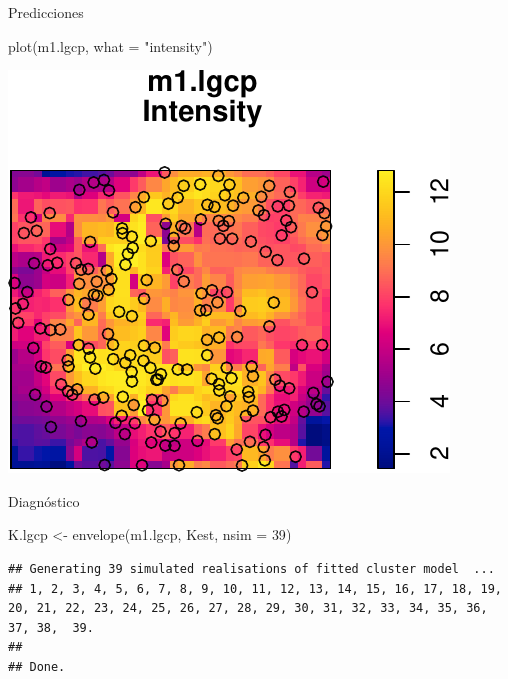 \documentclass[
  11pt,
  ignorenonframetext,
]{beamer}
\newenvironment{Shaded}{}{}
\newcommand{\AttributeTok}[1]{\textcolor[rgb]{0.49,0.56,0.16}{#1}}
\newcommand{\DecValTok}[1]{\textcolor[rgb]{0.25,0.63,0.44}{#1}}
\newcommand{\FunctionTok}[1]{\textcolor[rgb]{0.02,0.16,0.49}{#1}}
\newcommand{\NormalTok}[1]{#1}
\newcommand{\OtherTok}[1]{\textcolor[rgb]{0.00,0.44,0.13}{#1}}
\newcommand{\StringTok}[1]{\textcolor[rgb]{0.25,0.44,0.63}{#1}}
\begin{document}
\begin{frame}[fragile]{Predicciones}
\protect\hypertarget{predicciones}{}
\begin{Shaded}
\begin{Highlighting}[]
\FunctionTok{plot}\NormalTok{(m1.lgcp, }\AttributeTok{what =} \StringTok{"intensity"}\NormalTok{)}
\end{Highlighting}
\end{Shaded}

\begin{center}\includegraphics{Tutorial-spatstat-2_files/figure-beamer/unnamed-chunk-38-1} \end{center}
\end{frame}

\begin{frame}[fragile]{Diagnóstico}
\protect\hypertarget{diagnuxf3stico}{}
\begin{Shaded}
\begin{Highlighting}[]
\NormalTok{K.lgcp }\OtherTok{\textless{}{-}} \FunctionTok{envelope}\NormalTok{(m1.lgcp, Kest, }\AttributeTok{nsim =} \DecValTok{39}\NormalTok{)}
\end{Highlighting}
\end{Shaded}

\begin{verbatim}
## Generating 39 simulated realisations of fitted cluster model  ...
## 1, 2, 3, 4, 5, 6, 7, 8, 9, 10, 11, 12, 13, 14, 15, 16, 17, 18, 19, 20, 21, 22, 23, 24, 25, 26, 27, 28, 29, 30, 31, 32, 33, 34, 35, 36, 37, 38,  39.
## 
## Done.
\end{verbatim}
\end{frame}
\end{document}
